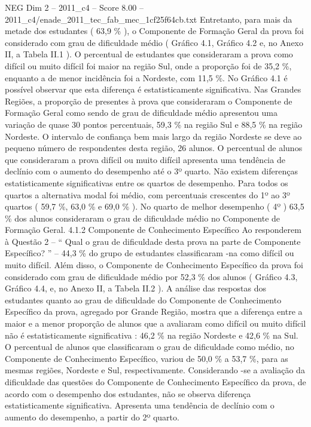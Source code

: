 \begin{textsample}{NEG Dim 2 – 2011\_c4 – Score 8.00 – 2011\_c4/enade\_2011\_tec\_fab\_mec\_1cf25f64cb.txt}
Entretanto, para mais da metade dos estudantes ( 63,9 \% ), o Componente de Formação Geral da prova foi considerado com grau de dificuldade médio ( Gráfico 4.1, Gráfico 4.2 e, no Anexo II, a Tabela II.1 ).
O percentual de estudantes que consideraram a prova como difícil ou muito difícil foi maior na região Sul, onde a proporção foi de 35,2 \%, enquanto a de menor incidência foi a Nordeste, com 11,5 \%.
No Gráfico 4.1 é possível observar que esta diferença é estatisticamente significativa.
Nas Grandes Regiões, a proporção de presentes à prova que consideraram o Componente de Formação Geral como sendo de grau de dificuldade médio apresentou uma variação de quase 30 pontos percentuais, 59,3 \% na região Sul e 88,5 \% na região Nordeste.
O intervalo de confiança bem mais largo da região Nordeste se deve ao pequeno número de respondentes desta região, 26 alunos.
O percentual de alunos que consideraram a prova difícil ou muito difícil apresenta uma tendência de declínio com o aumento do desempenho até o 3º quarto.
Não existem diferenças estatisticamente significativas entre os quartos de desempenho.
Para todos os quartos a alternativa modal foi médio, com percentuais crescentes do 1º ao 3º quartos ( 59,7 \%, 63,0 \% e 69,0 \% ).
No quarto de melhor desempenho ( 4º ) 63,5 \% dos alunos consideraram o grau de dificuldade médio no Componente de Formação Geral. 4.1.2 Componente de Conhecimento Específico Ao responderem à Questão 2 – “ Qual o grau de dificuldade desta prova na parte de Componente Específico? ” – 44,3 \% do grupo de estudantes classificaram -na como difícil ou muito difícil.
Além disso, o Componente de Conhecimento Específico da prova foi considerado com grau de dificuldade médio por 52,3 \% dos alunos ( Gráfico 4.3, Gráfico 4.4, e, no Anexo II, a Tabela II.2 ).
A análise das respostas dos estudantes quanto ao grau de dificuldade do Componente de Conhecimento Específico da prova, agregado por Grande Região, mostra que a diferença entre a maior e a menor proporção de alunos que a avaliaram como difícil ou muito difícil não é estatisticamente significativa : 46,2 \% na região Nordeste e 42,6 \% na Sul.
O percentual de alunos que classificaram o grau de dificuldade como médio, no Componente de Conhecimento Específico, variou de 50,0 \% a 53,7 \%, para as mesmas regiões, Nordeste e Sul, respectivamente.
Considerando -se a avaliação da dificuldade das questões do Componente de Conhecimento Específico da prova, de acordo com o desempenho dos estudantes, não se observa diferença estatisticamente significativa.
Apresenta uma tendência de declínio com o aumento do desempenho, a partir do 2º quarto.

\end{textsample}
